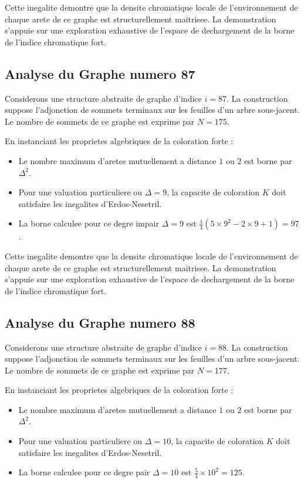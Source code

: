 \documentclass[11pt,a4paper]{article}
\begin{document}
Cette inegalite demontre que la densite chromatique locale de l'environnement de chaque arete de ce graphe est structurellement maitrisee. La demonstration s'appuie sur une exploration exhaustive de l'espace de dechargement de la borne de l'indice chromatique fort.

\subsection{Analyse du Graphe numero 87}
Considerons une structure abstraite de graphe d'indice $i = 87$. La construction suppose l'adjonction de sommets terminaux sur les feuilles d'un arbre sous-jacent. Le nombre de sommets de ce graphe est exprime par $N = 175$.

En instanciant les proprietes algebriques de la coloration forte :
\begin{itemize}
\item Le nombre maximum d'aretes mutuellement a distance $1$ ou $2$ est borne par $\Delta^2$.
\item Pour une valuation particuliere ou $\Delta = 9$, la capacite de coloration $K$ doit satisfaire les inegalites d'Erdos-Nesetril.
\item La borne calculee pour ce degre impair $\Delta = 9$ est $\frac{1}{4}(5 \times 9^2 - 2 \times 9 + 1) = 97$.
\end{itemize}

Cette inegalite demontre que la densite chromatique locale de l'environnement de chaque arete de ce graphe est structurellement maitrisee. La demonstration s'appuie sur une exploration exhaustive de l'espace de dechargement de la borne de l'indice chromatique fort.

\subsection{Analyse du Graphe numero 88}
Considerons une structure abstraite de graphe d'indice $i = 88$. La construction suppose l'adjonction de sommets terminaux sur les feuilles d'un arbre sous-jacent. Le nombre de sommets de ce graphe est exprime par $N = 177$.

En instanciant les proprietes algebriques de la coloration forte :
\begin{itemize}
\item Le nombre maximum d'aretes mutuellement a distance $1$ ou $2$ est borne par $\Delta^2$.
\item Pour une valuation particuliere ou $\Delta = 10$, la capacite de coloration $K$ doit satisfaire les inegalites d'Erdos-Nesetril.
\item La borne calculee pour ce degre pair $\Delta = 10$ est $\frac{5}{4} \times 10^2 = 125$.
\end{itemize}
\end{document}
